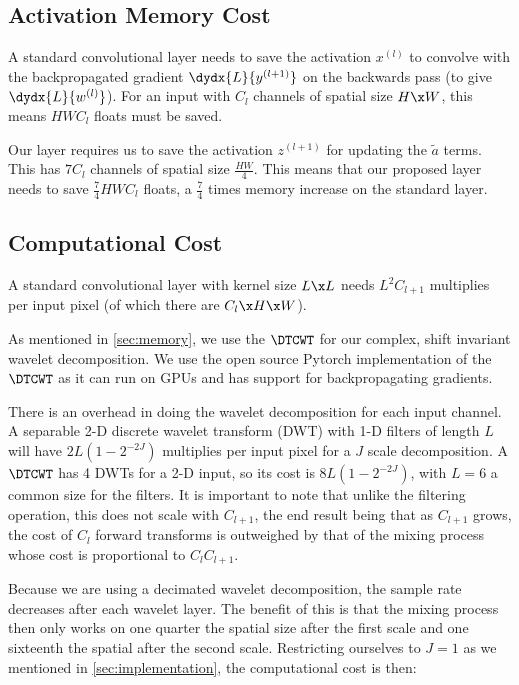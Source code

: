 \subsection{Activation Memory Cost}
A standard convolutional layer needs to save the activation $x^{(l)}$ to
convolve with the backpropagated gradient $\dydx{L}{y^{(l+1)}}$ on the backwards
pass (to give $\dydx{L}{w^{(l)}}$). For an input with $C_l$ channels of spatial size $H\x W$, this means
$HWC_l$ floats must be saved. 

Our layer requires us to save the activation
$z^{(l+1)}$ for updating the $\tilde{a}$ terms. This has $7C_l$ channels of
spatial size $\frac{HW}{4}$. This means that our proposed layer needs to save
$\frac{7}{4}HWC_l$ floats, a $\frac{7}{4}$ times memory increase on the standard
layer.



\subsection{Computational Cost}\label{sec:computation}
A standard convolutional layer with kernel size $L\x L$ needs $L^2C_{l+1}$
multiplies per input pixel (of which there are $C_{l}\x H\x W$).

As mentioned in \autoref{sec:memory}, we use the $\DTCWT$ for our complex, shift
invariant wavelet decomposition. We use the open source Pytorch implementation
of the $\DTCWT$ \cite{cotter_pytorch_2018} as it can run on GPUs and
has support for backpropagating gradients.

There is an overhead in doing the wavelet decomposition for each input channel.
A separable 2-D discrete wavelet transform (DWT) with 1-D filters of length $L$
will have $2L\left(1-2^{-2J}\right)$ multiplies per input pixel for a $J$ scale
decomposition. A $\DTCWT$ has 4 DWTs for a 2-D input, so its cost is
$8L\left(1-2^{-2J}\right)$, with $L=6$ a common size for the filters. It is
important to note that unlike the filtering operation, this does not scale with
$C_{l+1}$, the end result being that as $C_{l+1}$ grows, the cost of $C_l$
forward transforms is outweighed by that of the mixing process whose cost is
proportional to $C_l C_{l+1}$.

Because we are using a decimated wavelet decomposition, the sample rate
decreases after each wavelet layer. The benefit of this is that the mixing
process then only works on one quarter the spatial size after the first scale
and one sixteenth the spatial after the second scale. Restricting ourselves to
$J=1$ as we mentioned in \autoref{sec:implementation}, the computational cost is
then:

